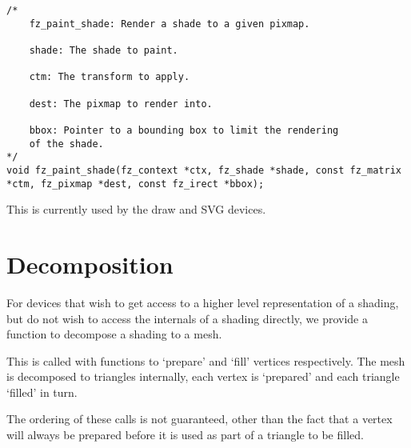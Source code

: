 \documentclass[oneside]{book}
\begin{document}
\begin{lstlisting}
/*
	fz_paint_shade: Render a shade to a given pixmap.

	shade: The shade to paint.

	ctm: The transform to apply.

	dest: The pixmap to render into.

	bbox: Pointer to a bounding box to limit the rendering
	of the shade.
*/
void fz_paint_shade(fz_context *ctx, fz_shade *shade, const fz_matrix *ctm, fz_pixmap *dest, const fz_irect *bbox);
\end{lstlisting}

This is currently used by the draw and SVG devices. 

\section{Decomposition}

For devices that wish to get access to a higher level representation of a shading, but do not wish to access the internals of a shading directly, we provide a function to decompose a shading to a mesh.

This is called with functions to `prepare' and `fill' vertices respectively. The mesh is decomposed to triangles internally, 
each vertex is `prepared' and each triangle `filled' in turn.

The ordering of these calls is not guaranteed, other than the fact that a vertex will always be prepared before it is used as part of a triangle to be filled.
\end{document}
